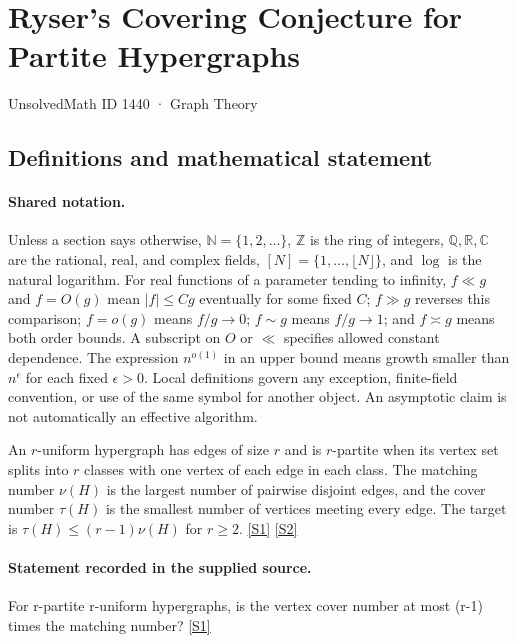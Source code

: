 \documentclass[11pt,a4paper]{article}
\newcommand{\N}{\mathbb{N}}
\newcommand{\Z}{\mathbb{Z}}
\newcommand{\Q}{\mathbb{Q}}
\newcommand{\R}{\mathbb{R}}
\newcommand{\C}{\mathbb{C}}
\newcommand{\sref}[2]{\hyperlink{source:#1:#2}{[S#2]}}
\begin{document}

\setcounter{section}{1439}

\section{Ryser’s Covering Conjecture for Partite Hypergraphs}\label{1440}

{\small\sffamily UnsolvedMath ID 1440 · Graph Theory}

\subsection{Definitions and mathematical statement}

\paragraph{Shared notation.}Unless a section says otherwise, $\N=\{1,2,\ldots\}$,
$\Z$ is the ring of integers, $\Q,\R,\C$ are the rational, real, and complex
fields, $[N]=\{1,\ldots,\lfloor N\rfloor\}$, and $\log$ is the natural
logarithm. For real functions of a parameter tending to infinity,
$f\ll g$ and $f=O(g)$ mean $|f|\leq Cg$ eventually for some fixed $C$;
$f\gg g$ reverses this comparison; $f=o(g)$ means $f/g\to0$;
$f\sim g$ means $f/g\to1$; and $f\asymp g$ means both order bounds.
A subscript on $O$ or $\ll$ specifies allowed constant dependence.
The expression $n^{o(1)}$ in an upper bound means growth smaller than
$n^\epsilon$ for each fixed $\epsilon>0$. Local definitions govern any
exception, finite-field convention, or use of the same symbol for another
object. An asymptotic claim is not automatically an effective algorithm.



An $r$-uniform hypergraph has edges of size $r$ and is $r$-partite when its vertex set splits into $r$ classes with one vertex of each edge in each class. The matching number $\nu(H)$ is the largest number of pairwise disjoint edges, and the cover number $\tau(H)$ is the smallest number of vertices meeting every edge. The target is $\tau(H)\leq(r-1)\nu(H)$ for $r\geq2$. \sref{1440}{1} \sref{1440}{2}

\paragraph{Statement recorded in the supplied source.}
For r-partite r-uniform hypergraphs, is the vertex cover number at most (r-1) times the matching number? \sref{1440}{1}
\end{document}
